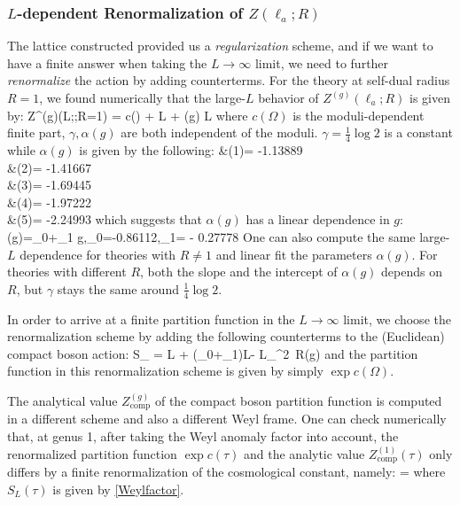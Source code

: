 \documentclass[12pt]{article}
\begin{document}
\subsubsection*{$L$-dependent Renormalization of $Z(\ell_a;R)$}

The lattice constructed provided us a \textit{regularization} scheme, and if we want to have a finite answer when taking the $L\rightarrow \infty$ limit, we need to further \textit{renormalize} the action by adding counterterms. For the theory at self-dual radius $R=1$, we found numerically that the large-$L$ behavior of $Z^{(g)}(\ell_a;R)$ is given by:
\ie
\log Z^{(g)}(L;\Omega;R=1) = c(\Omega) + \gamma L + \alpha(g) \log L
\fe
where $c(\Omega)$ is the moduli-dependent finite part, $\gamma, \alpha(g)$ are both independent of the moduli. $\gamma = \frac{1}{4} \log 2$ is a constant while $\alpha(g)$ is given by the following:
\ie
&\alpha(1)= -1.13889\\
&\alpha(2)= -1.41667\\
&\alpha(3)= -1.69445\\
&\alpha(4)= -1.97222\\
&\alpha(5)= -2.24993
\fe
which suggests that $\alpha(g)$ has a linear dependence in $g$:
\ie
\alpha(g)=\alpha_0+\alpha_1 g,\quad \alpha_0=-0.86112,\quad \alpha_1= - 0.27778
\fe
One can also compute the same large-$L$ dependence for theories with $R\neq 1$ and linear fit the parameters $\alpha(g)$. For theories with different $R$, both the slope and the intercept of $\alpha(g)$ depends on $R$, but $\gamma$ stays the same around $\frac{1}{4} \log 2$.

In order to arrive at a finite partition function in the $L\rightarrow \infty$ limit, we choose the renormalization scheme by adding the following counterterms to the (Euclidean) compact boson action:
\ie
S_ = \gamma L + (\alpha_0+\alpha_1)\log L- \log L\int_\Sigma {}^2\sigma {}\, R(g)
\fe
and the partition function in this renormalization scheme is given by simply $\exp c(\Omega)$.

The analytical value $Z_\text{comp}^{(g)}$ of the compact boson partition function is computed in a different scheme and also a different Weyl frame. One can check numerically that, at genus 1, after taking the Weyl anomaly factor into account, the renormalized partition function $\exp c(\tau)$ and the analytic value $Z_\text{comp}^{(1)}(\tau)$ only differs by a finite renormalization of the cosmological constant, namely:
\ie
{} = 
\label{compactWeyltest}
\fe
where $S_L(\tau)$ is given by \eqref{Weylfactor}.
\end{document}
